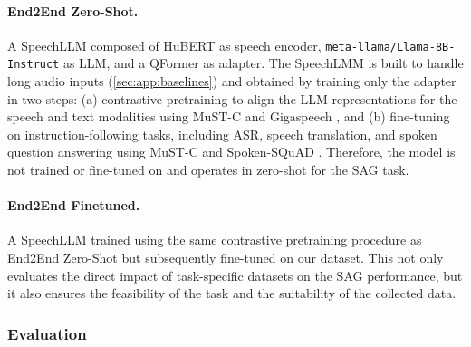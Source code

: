 \paragraph{End2End Zero-Shot.} A SpeechLLM composed of HuBERT \citep{hubert-2021} as speech encoder, \texttt{meta\--llama/\-Llama\--8B\--Instruct} as LLM, and a QFormer \citep{Li2023BLIP2BL} as adapter. The SpeechLMM is built to handle long audio inputs (\cref{sec:app:baselines}) and obtained by training only the adapter in two steps: (a) contrastive pretraining \citep{züfle2024contrastivelearningtaskindependentspeechllmpretraining} to align the LLM representations for the speech and text modalities using MuST-C \citep{di-gangi-etal-2019-must} and Gigaspeech \citep{chen-2021-gigaspeech}, and (b) fine-tuning on instruction-following tasks, including ASR, speech translation, and spoken question answering using MuST-C and Spoken-SQuAD \citep{lee2018spoken}. Therefore, the model is not trained or fine-tuned on \DATASETNAME{} and operates in zero-shot for the SAG task.

\paragraph{End2End Finetuned.} A SpeechLLM trained using the same contrastive pretraining procedure as End2End Zero-Shot but subsequently fine-tuned on our \DATASETNAME{} dataset. 
This not only evaluates the direct impact of task-specific datasets on the SAG performance, but it also ensures the feasibility of the task and the suitability of the collected data.



\subsubsection{Evaluation}
